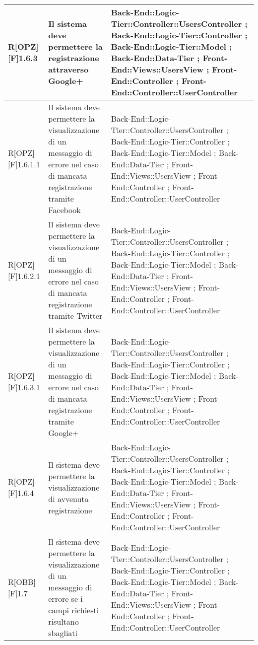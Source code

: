 	\begin{table}[h]
		\begin{tabular}{|p{}|p{}|p{}|}
			\midrule	
			
			R[OPZ][F]1.6.3 & Il sistema deve permettere la registrazione attraverso Google+ & Back-End::Logic-Tier::Controller::UsersController ; Back-End::Logic-Tier::Controller ; Back-End::Logic-Tier::Model ; Back-End::Data-Tier ; Front-End::Views::UsersView ; Front-End::Controller ; Front-End::Controller::UserController \\ \midrule
			R[OPZ][F]1.6.1.1 & Il sistema deve permettere la visualizzazione di un messaggio di errore nel caso di mancata registrazione tramite Facebook & Back-End::Logic-Tier::Controller::UsersController ; Back-End::Logic-Tier::Controller ; Back-End::Logic-Tier::Model ; Back-End::Data-Tier ; Front-End::Views::UsersView ; Front-End::Controller ; Front-End::Controller::UserController \\ \midrule
			R[OPZ][F]1.6.2.1 & Il sistema deve permettere la visualizzazione di un messaggio di errore nel caso di mancata registrazione tramite Twitter & Back-End::Logic-Tier::Controller::UsersController ; Back-End::Logic-Tier::Controller ; Back-End::Logic-Tier::Model ; Back-End::Data-Tier ; Front-End::Views::UsersView ; Front-End::Controller ; Front-End::Controller::UserController \\ \midrule
			R[OPZ][F]1.6.3.1 & Il sistema deve permettere la visualizzazione di un messaggio di errore nel caso di mancata registrazione tramite Google+ & Back-End::Logic-Tier::Controller::UsersController ; Back-End::Logic-Tier::Controller ; Back-End::Logic-Tier::Model ; Back-End::Data-Tier ; Front-End::Views::UsersView ; Front-End::Controller ; Front-End::Controller::UserController \\ \midrule
			R[OPZ][F]1.6.4 & Il sistema deve permettere la visualizzazione di avvenuta registrazione  & Back-End::Logic-Tier::Controller::UsersController ; Back-End::Logic-Tier::Controller ; Back-End::Logic-Tier::Model ; Back-End::Data-Tier ; Front-End::Views::UsersView ; Front-End::Controller ; Front-End::Controller::UserController \\ \midrule
			R[OBB][F]1.7 & Il sistema deve permettere la visualizzazione di un messaggio di errore se i campi richiesti risultano sbagliati & Back-End::Logic-Tier::Controller::UsersController ; Back-End::Logic-Tier::Controller ; Back-End::Logic-Tier::Model ; Back-End::Data-Tier ; Front-End::Views::UsersView ; Front-End::Controller ; Front-End::Controller::UserController \\ \midrule

\end{tabular}
\end{table}
